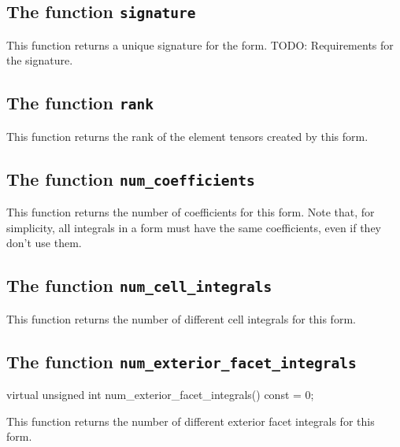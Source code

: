 \subsection{The function \texttt{signature}}
This function returns a unique signature for the form.
TODO: Requirements for the signature.



\subsection{The function \texttt{rank}}
This function returns the rank of the element tensors created by this form.



\subsection{The function \texttt{num\_coefficients}}
This function returns the number of coefficients for this form.
Note that, for simplicity, all integrals in a form must have
the same coefficients, even if they don't use them.



\subsection{The function \texttt{num\_cell\_integrals}}
This function returns the number of different cell integrals for this form.


\subsection{The function \texttt{num\_exterior\_facet\_integrals}}
\begin{code}
virtual unsigned int num_exterior_facet_integrals() const = 0;
\end{code}
This function returns the number of different exterior facet integrals for this form.



